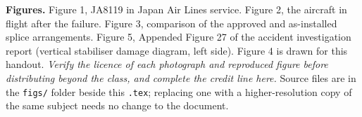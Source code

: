 \documentclass[11pt,a4paper]{article}
\begin{document}
\medskip
\textbf{Figures.} Figure 1, JA8119 in Japan Air Lines service. Figure 2, the aircraft in flight after the failure. Figure 3, comparison of the approved and as-installed splice arrangements. Figure 5, Appended Figure 27 of the accident investigation report (vertical stabiliser damage diagram, left side). Figure 4 is drawn for this handout. \emph{Verify the licence of each photograph and reproduced figure before distributing beyond the class, and complete the credit line here.} Source files are in the \texttt{figs/} folder beside this \texttt{.tex}; replacing one with a higher-resolution copy of the same subject needs no change to the document.
\end{document}
